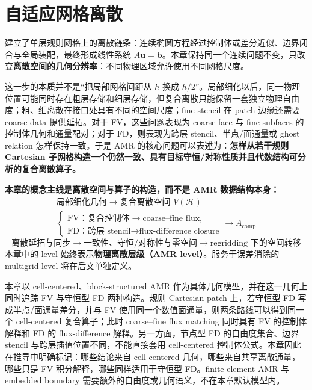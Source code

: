\chapter{自适应网格离散}
\label{ch:amr-discretization}

建立了单层规则网格上的离散链条：连续椭圆方程经过控制体或差分近似、边界闭合与全局装配，最终形成线性系统 $A\bm u=\bm b$。本章保持同一个连续问题不变，只改变\textbf{离散空间的几何分辨率}：不同物理区域允许使用不同网格尺度。

这一步的本质并不是“把局部网格间距从 $h$ 换成 $h/2$”。局部细化以后，同一物理位置可能同时存在粗层存储和细层存储，但复合离散只能保留一套独立物理自由度；粗、细离散在接口处具有不同的空间尺度；fine stencil 在 patch 边缘还需要 coarse data 提供延拓。对于 FV，这些问题表现为 coarse face 与 fine subfaces 的控制体几何和通量配对；对于 FD，则表现为跨层 stencil、半点/面通量或 ghost relation 怎样保持一致。于是 AMR 的核心问题可以表述为：\textbf{怎样从若干规则 Cartesian 子网格构造一个仍然一致、具有目标守恒/对称性质并且代数结构可分析的复合离散算子。}

\begin{keybox}
\textbf{本章的概念主线是离散空间与算子的构造，而不是 AMR 数据结构本身：}
\[
\boxed{
\begin{gathered}
\text{局部细化几何}\rightarrow\text{复合离散空间 }V(\mathcal H)\\
\begin{cases}
\text{FV：复合控制体}\rightarrow\text{coarse--fine flux},\\
\text{FD：跨层 stencil}\rightarrow\text{flux-difference closure}
\end{cases}
\rightarrow A_{\mathrm{comp}}
\end{gathered}}
\]
\[
\boxed{
\text{离散延拓与同步}
\rightarrow
\text{一致性、守恒/对称性与零空间}
\rightarrow
\text{regridding 下的空间转移}
}
\]
本章中的 level 始终表示\textbf{物理离散层级（AMR level）}。服务于误差消除的 multigrid level 将在后文单独定义。
\end{keybox}

本章以 cell-centered、block-structured AMR 作为具体几何模型，并在这一几何上同时追踪 FV 与守恒型 FD 两种构造。规则 Cartesian patch 上，若守恒型 FD 写成半点/面通量差分，并与 FV 使用同一个数值面通量，则两条路线可以得到同一个 cell-centered 复合算子；此时 coarse--fine flux matching 同时具有 FV 的控制体解释和 FD 的 flux-difference 解释。另一方面，节点型 FD 的自由度集合、边界 stencil 与跨层插值位置不同，不能直接套用 cell-centered 控制体公式。本章因此在推导中明确标记：哪些结论来自 cell-centered 几何，哪些来自共享离散通量，哪些只是 FV 积分解释，哪些同样适用于守恒型 FD。finite element AMR 与 embedded boundary 需要额外的自由度或几何语义，不在本章默认模型内。

